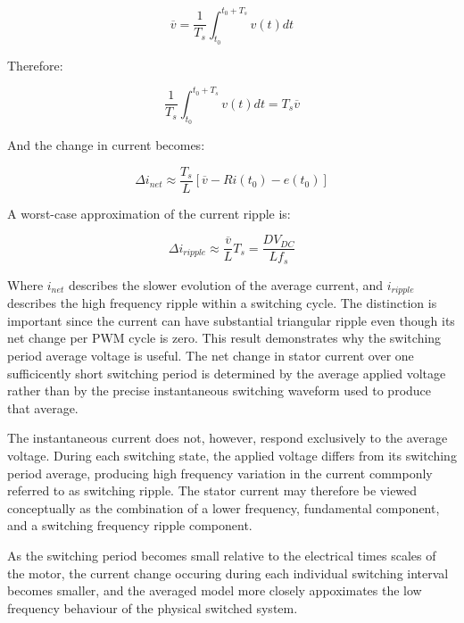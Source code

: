 \documentclass{article}
\begin{document}
\begin{equation}
    \overline{v} = \frac{1}{T_s}\int_{t_0}^{t_0 + T_s} v(t)dt
\end{equation}

Therefore:

\begin{equation}
    \frac{1}{T_s}\int_{t_0}^{t_0 + T_s} v(t)dt = T_s\overline{v}
\end{equation}

And the change in current becomes:

\begin{equation}
    \Delta i_{net} \approx \frac{T_s}{L}[\overline{v} - Ri(t_0) - e(t_0)]
\end{equation}

A worst-case approximation of the current ripple is:

\begin{equation}
    \Delta i_{ripple} \approx \frac{\overline{v}}{L}T_s = \frac{DV_{DC}}{Lf_{s}}
\end{equation}

Where $i_{net}$ describes the slower evolution of the average current, and $i_{ripple}$ describes the high frequency ripple within a switching cycle. The distinction is important since the current can have substantial triangular ripple even though its net change per PWM cycle is zero. This result demonstrates why the switching period average voltage is useful. The net change in stator current over one sufficicently short switching period is determined by the average applied voltage rather than by the precise instantaneous switching waveform used to produce that average.

The instantaneous current does not, however, respond exclusively to the average voltage. During each switching state, the applied voltage differs from its switching period average, producing high frequency variation in the current commponly referred to as switching ripple. The stator current may therefore be viewed conceptually as the combination of a lower frequency, fundamental component, and a switching frequency ripple component.

As the switching period becomes small relative to the electrical times scales of the motor, the current change occuring during each individual switching interval becomes smaller, and the averaged model more closely appoximates the low frequency behaviour of the physical switched system.


\end{document}
